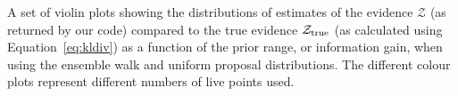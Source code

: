 \label{fig:walkunipropevs}
A set of violin plots showing the distributions of estimates of the evidence
$\mathcal{Z}$ (as returned by our code) compared to the true evidence $\mathcal{Z}_{\rm true}$ (as
calculated using Equation~\ref{eq:kldiv}) as a function of the prior range,
or information gain, when using the ensemble walk and uniform proposal
distributions. The different colour plots represent different numbers
of live points used.
